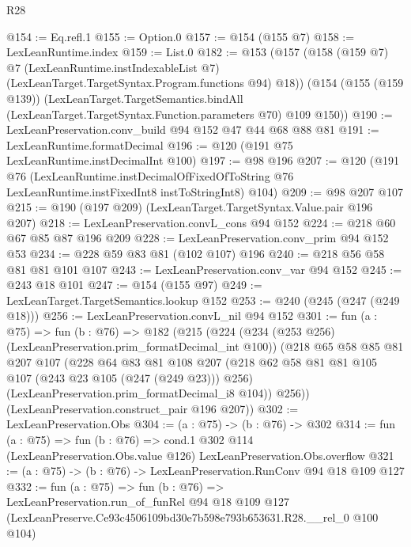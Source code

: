 \begin{lexlean}{R28}
\begin{coremodule}
@154 := Eq.refl.{1}
@155 := Option.{0}
@157 := @154 (@155 @7)
@158 := LexLeanRuntime.index
@159 := List.{0}
@182 := @153
    (@157
      (@158
        (@159 @7)
        @7
        (LexLeanRuntime.instIndexableList @7)
        (LexLeanTarget.TargetSyntax.Program.functions @94)
        @18))
    (@154
      (@155 (@159 @139))
      (LexLeanTarget.TargetSemantics.bindAll
        (LexLeanTarget.TargetSyntax.Function.parameters @70)
        @109
        @150))
@190 := LexLeanPreservation.conv_build @94 @152 @47 @44 @68 @88 @81
@191 := LexLeanRuntime.formatDecimal
@196 := @120 (@191 @75 LexLeanRuntime.instDecimalInt @100)
@197 := @98 @196
@207 := @120
    (@191
      @76
      (LexLeanRuntime.instDecimalOfFixedOfToString
        @76
        LexLeanRuntime.instFixedInt8
        instToStringInt8)
      @104)
@209 := @98 @207 @107
@215 := @190 (@197 @209) (LexLeanTarget.TargetSyntax.Value.pair @196 @207)
@218 := LexLeanPreservation.convL_cons @94 @152
@224 := @218 @60 @67 @85 @87 @196 @209
@228 := LexLeanPreservation.conv_prim @94 @152 @53
@234 := @228 @59 @83 @81 (@102 @107) @196
@240 := @218 @56 @58 @81 @81 @101 @107
@243 := LexLeanPreservation.conv_var @94 @152
@245 := @243 @18 @101
@247 := @154 (@155 @97)
@249 := LexLeanTarget.TargetSemantics.lookup @152
@253 := @240 (@245 (@247 (@249 @18)))
@256 := LexLeanPreservation.convL_nil @94 @152
@301 := fun (a : @75) =>
  fun (b : @76) =>
  @182
    (@215
      (@224
        (@234 (@253 @256) (LexLeanPreservation.prim_formatDecimal_int @100))
        (@218
          @65
          @58
          @85
          @81
          @207
          @107
          (@228
            @64
            @83
            @81
            @108
            @207
            (@218 @62 @58 @81 @81 @105 @107 (@243 @23 @105 (@247 (@249 @23))) @256)
            (LexLeanPreservation.prim_formatDecimal_i8 @104))
          @256))
      (LexLeanPreservation.construct_pair @196 @207))
@302 := LexLeanPreservation.Obs
@304 := (a : @75) -> (b : @76) -> @302
@314 := fun (a : @75) =>
  fun (b : @76) =>
  cond.{1} @302 @114 (LexLeanPreservation.Obs.value @126) LexLeanPreservation.Obs.overflow
@321 := (a : @75) -> (b : @76) -> LexLeanPreservation.RunConv @94 @18 @109 @127
@332 := fun (a : @75) =>
  fun (b : @76) =>
  LexLeanPreservation.run_of_funRel
    @94
    @18
    @109
    @127
    (LexLeanPreserve.Ce93c4506109bd30e7b598e793b653631.R28.__rel_0 @100 @104)
\end{coremodule}
\end{lexlean}

